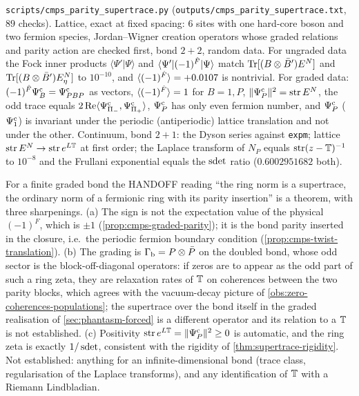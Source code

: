 \begin{numerical}
\label{num:cmps-parity-supertrace}
\texttt{scripts/cmps\_parity\_supertrace.py} (\texttt{outputs/cmps\_parity\_supertrace.txt},
$89$ checks). Lattice, exact at fixed spacing: $6$ sites with one hard-core boson and two
fermion species, Jordan--Wigner creation operators whose graded relations and parity action
are checked first, bond $2+2$, random data. For ungraded data the Fock inner products
$\langle\Psi'|\Psi\rangle$ and $\langle\Psi'|(-1)^{\hat F}|\Psi\rangle$ match $\operatorname{Tr}[(B\otimes\bar
B')E^N]$ and $\operatorname{Tr}[(B\otimes\bar B')E_\eta^N]$ to $10^{-10}$, and $\langle(-1)^{\hat F}\rangle=+0.0107$
is nontrivial. For graded data: $(-1)^{\hat F}\Psi^{\mathrm c}_{B}=\Psi^{\mathrm c}_{PBP}$ as vectors, $\langle(-1)^{\hat F}\rangle=1$
for $B=1,P$, $\|\Psi^{\mathrm c}_{P}\|^2=\operatorname{str} E^N$, the odd trace equals $2\operatorname{Re}\langle\Psi^{\mathrm c}_{\Pi_{-}},
\Psi^{\mathrm c}_{\Pi_{+}}\rangle$, $\Psi^{\mathrm c}_{P}$ has only even fermion number, and $\Psi^{\mathrm c}_{P}$ ($\Psi^{\mathrm c}_{1}$)
is invariant under the periodic (antiperiodic) lattice translation and not under the other.
Continuum, bond $2+1$: the Dyson series against \texttt{expm}; lattice $\operatorname{str} E^N\to\operatorname{str}
e^{L\mathbb T}$ at first order; the Laplace transform of $N_P$ equals $\operatorname{str}(z-\mathbb T)^{-1}$ to
$10^{-8}$ and the Frullani exponential equals the $\operatorname{sdet}$ ratio ($0.6002951682$ both).
\end{numerical}

\begin{observation}
\label{obs:cmps-supertrace-reading}
For a finite graded bond the HANDOFF reading ``the ring norm is a supertrace, the ordinary norm
of a fermionic ring with its parity insertion'' is a theorem, with three sharpenings. (a) The
sign is not the expectation value of the physical $(-1)^F$, which is $\pm1$
(\cref{prop:cmps-graded-parity}); it is the bond parity inserted in the closure, i.e.\ the
periodic fermion boundary condition (\cref{prop:cmps-twist-translation}). (b) The grading is
$\Gamma_{\mathrm b}=P\otimes\bar P$ on the doubled bond, whose odd sector is the block-off-diagonal operators:
if zeros are to appear as the odd part of such a ring zeta, they are relaxation rates of
$\mathbb T$ on coherences between the two parity blocks, which agrees with the vacuum-decay picture of \cref{obs:zero-coherences-populations}; the supertrace
over the bond itself in the graded realisation of \cref{sec:phantasm-forced} is a different
operator and its relation to a $\mathbb T$ is not established. (c) Positivity
$\operatorname{str} e^{L\mathbb T}=\|\Psi^{\mathrm c}_{P}\|^2\ge0$ is automatic, and the ring zeta is exactly $1/\operatorname{sdet}$,
consistent with the rigidity of \cref{thm:supertrace-rigidity}. Not established: anything for
an infinite-dimensional bond (trace class, regularisation of the Laplace transforms), and any
identification of $\mathbb T$ with a Riemann Lindbladian.
\end{observation}
